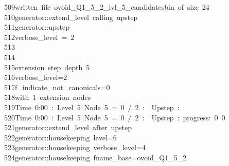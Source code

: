 \begin{tabbing}
509\>written\ file\ ovoid\_Q1\_5\_2\_lvl\_5\_candidatesbin\ of\ size\ 24\\[0pt]
510\>generator::extend\_level\ calling\ upstep\\[0pt]
511\>generator::upstep\\[0pt]
512\>verbose\_level\ =\ 2\\[0pt]
513\>\\[0pt]
514\>\\[0pt]
515\>extension\ step\ depth\ 5\\[0pt]
516\>verbose\_level=2\\[0pt]
517\>f\_indicate\_not\_canonicals=0\\[0pt]
518\>with\ 1\ extension\ nodes\\[0pt]
519\>Time\ 0:00\ :\ Level\ 5\ Node\ 5\ =\ 0\ /\ 2\ :\ \ Upstep\ :\ \\[0pt]
520\>Time\ 0:00\ :\ Level\ 5\ Node\ 5\ =\ 0\ /\ 2\ :\ \ Upstep\ :\ progress:\ 0\ 0\ \ \\[0pt]
521\>generator::extend\_level\ after\ upstep\\[0pt]
522\>generator::housekeeping\ level=6\\[0pt]
523\>generator::housekeeping\ verbose\_level=4\\[0pt]
524\>generator::housekeeping\ fname\_base=ovoid\_Q1\_5\_2\\[0pt]

\end{tabbing}
